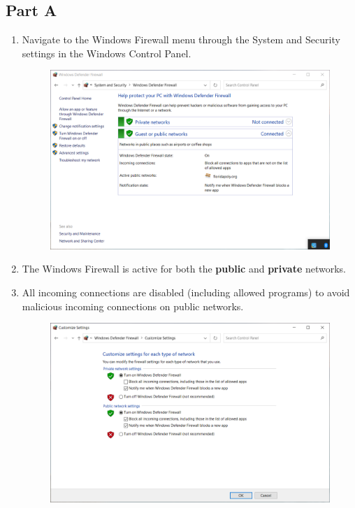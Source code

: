 \subsection*{Part A}
\begin{enumerate}
    \item Navigate to the Windows Firewall menu through the System and Security settings in the Windows Control Panel.
    \begin{figure}[H]
        \includegraphics[width=\linewidth]{figures/pic1.png}
    \end{figure}
    \item The Windows Firewall is active for both the \textbf{public} and \textbf{private} networks.
    \item All incoming connections are disabled (including allowed programs) to avoid malicious incoming connections on public networks.
    \begin{figure}[H]
        \includegraphics[width=\linewidth]{figures/pic2.png}

\end{figure}
\end{enumerate}
